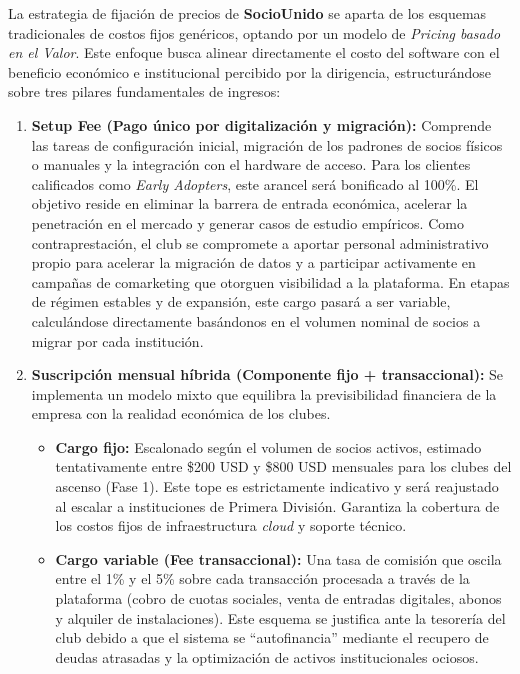 La estrategia de fijación de precios de \textbf{SocioUnido} se aparta de los esquemas tradicionales de costos fijos genéricos, optando por un modelo de \textit{Pricing basado en el Valor}. Este enfoque busca alinear directamente el costo del software con el beneficio económico e institucional percibido por la dirigencia, estructurándose sobre tres pilares fundamentales de ingresos:

\begin{enumerate}
    \item \textbf{Setup Fee (Pago único por digitalización y migración):} Comprende las tareas de configuración inicial, migración de los padrones de socios físicos o manuales y la integración con el hardware de acceso. Para los clientes calificados como \textit{Early Adopters}, este arancel será bonificado al 100\%. El objetivo reside en eliminar la barrera de entrada económica, acelerar la penetración en el mercado y generar casos de estudio empíricos. Como contraprestación, el club se compromete a aportar personal administrativo propio para acelerar la migración de datos y a participar activamente en campañas de comarketing que otorguen visibilidad a la plataforma. En etapas de régimen estables y de expansión, este cargo pasará a ser variable, calculándose directamente basándonos en el volumen nominal de socios a migrar por cada institución.
    \item \textbf{Suscripción mensual híbrida (Componente fijo + transaccional):} Se implementa un modelo mixto que equilibra la previsibilidad financiera de la empresa con la realidad económica de los clubes.
    \begin{itemize}
        \item \textbf{Cargo fijo:} Escalonado según el volumen de socios activos, estimado tentativamente entre \$200 USD y \$800 USD mensuales para los clubes del ascenso (Fase 1). Este tope es estrictamente indicativo y será reajustado al escalar a instituciones de Primera División. Garantiza la cobertura de los costos fijos de infraestructura \textit{cloud} y soporte técnico.
        \item \textbf{Cargo variable (Fee transaccional):} Una tasa de comisión que oscila entre el 1\% y el 5\% sobre cada transacción procesada a través de la plataforma (cobro de cuotas sociales, venta de entradas digitales, abonos y alquiler de instalaciones). Este esquema se justifica ante la tesorería del club debido a que el sistema se ``autofinancia'' mediante el recupero de deudas atrasadas y la optimización de activos institucionales ociosos.

\end{itemize}
\end{enumerate}
